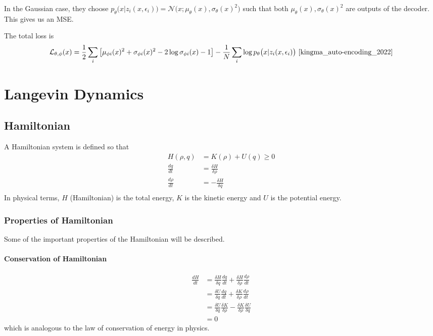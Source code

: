 \documentclass{book}
\numberwithin{equation}{subsection}
\begin{document}
In the Gaussian case, they choose $p_\theta \big(x|z_i(x, \epsilon_i) \big) = \mathcal{N}\big(x;\mu_\theta(x), \sigma_\theta(x)^2\big)$ such that both $\mu_\theta(x), \sigma_\theta(x)^2$ are outputs of the decoder. This gives us an MSE.

The total loss is
\begin{equation}
    \mathcal{L}_{\theta, \phi}(x) = \frac{1}{2}\sum_i\left[\mu_{\phi i}(x)^2+\sigma_{\phi i}(x)^2-2\log\sigma_{\phi i}(x) - 1\right] - \frac{1}{N}\sum_i \log p_\theta \big(x|z_i(x, \epsilon_i) \big)~\cite{kingma_auto-encoding_2022}
\end{equation}
\section{Langevin Dynamics}
\subsection{Hamiltonian}
A Hamiltonian system is defined so that
\begin{align}
    H(\rho, q) &= K(\rho) + U(q) \geq 0\\
    \frac{dq}{dt} &= \frac{\delta H}{\delta \rho}\\
    \frac{d\rho}{dt} &= -\frac{\delta H}{\delta q}\\
\end{align}
In physical terms, $H$ (Hamiltonian) is the total energy, $K$ is the kinetic energy and $U$ is the potential energy.
\subsubsection{Properties of Hamiltonian}
Some of the important properties of the Hamiltonian will be described.
\paragraph*{Conservation of Hamiltonian}
\begin{align}
    \frac{dH}{dt} &= \frac{\delta H}{\delta q}\frac{dq}{dt} + \frac{\delta H}{\delta \rho}\frac{d\rho}{dt}\\
    &= \frac{\delta U}{\delta q}\frac{dq}{dt} + \frac{\delta K}{\delta \rho}\frac{d\rho}{dt}\\
    &= \frac{\delta U}{\delta q}\frac{\delta K}{\delta \rho} - \frac{\delta K}{\delta \rho}\frac{\delta U}{\delta q}\\
    &= 0
\end{align}
which is analogous to the law of conservation of energy in physics.
\end{document}
